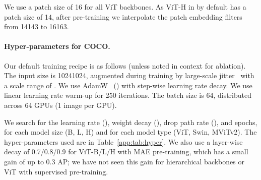 \documentclass[runningheads]{llncs}
\begin{document}
We use a patch size of 16 for all ViT backbones. As ViT-H in \cite{Dosovitskiy2021} by default has a patch size of 14, after pre-training we interpolate the patch embedding filters from 14143 to 16163. 

\paragraph{Hyper-parameters for COCO.}
Our default training recipe is as follows (unless noted in context for ablation).
The input size is 10241024, augmented during training by {large-scale jitter}~\cite{Ghiasi2021} with a scale range of . We use AdamW~\cite{Loshchilov2019} () with step-wise learning rate decay. We use linear learning rate warm-up \cite{Goyal2017} for 250 iterations. The batch size is 64, distributed across 64 GPUs (1 image per GPU).

We search for the learning rate (\lr), weight decay (\wtd), drop path rate (\drp), and epochs, for each model size (B, L, H) and for each model type (ViT, Swin, MViTv2).
The hyper-parameters used are in Table~\ref{app:tab:hyper}. We also use a layer-wise \lr decay \cite{Bao2021} of 0.7/0.8/0.9 for ViT-B/L/H with MAE pre-training, which has a small gain of up to 0.3 AP; we have not seen this gain for hierarchical backbones or ViT with supervised pre-training.
\end{document}
